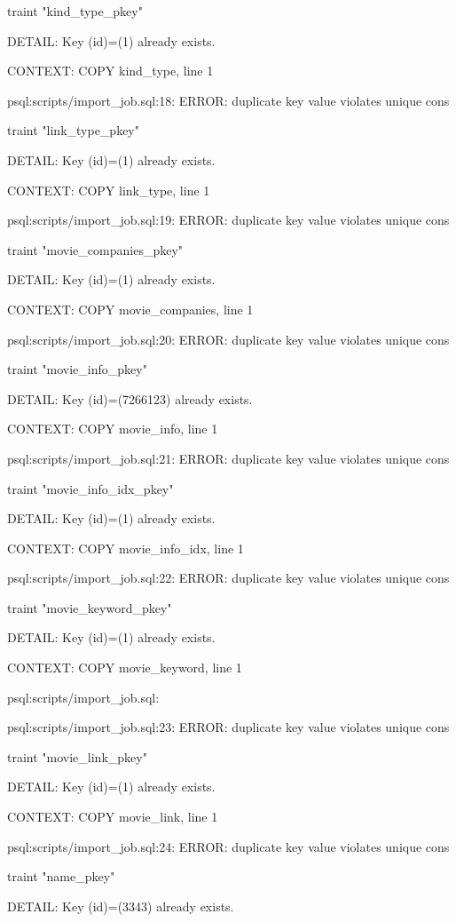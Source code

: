 \documentclass[11pt,a4paper]{article}
\begin{document}
traint "kind\_type\_pkey"

DETAIL:  Key (id)=(1) already exists.

CONTEXT:  COPY kind\_type, line 1

psql:scripts/import\_job.sql:18: ERROR:  duplicate key value violates unique cons

traint "link\_type\_pkey"

DETAIL:  Key (id)=(1) already exists.

CONTEXT:  COPY link\_type, line 1

psql:scripts/import\_job.sql:19: ERROR:  duplicate key value violates unique cons

traint "movie\_companies\_pkey"

DETAIL:  Key (id)=(1) already exists.

CONTEXT:  COPY movie\_companies, line 1

psql:scripts/import\_job.sql:20: ERROR:  duplicate key value violates unique cons

traint "movie\_info\_pkey"

DETAIL:  Key (id)=(7266123) already exists.

CONTEXT:  COPY movie\_info, line 1

psql:scripts/import\_job.sql:21: ERROR:  duplicate key value violates unique cons

traint "movie\_info\_idx\_pkey"

DETAIL:  Key (id)=(1) already exists.

CONTEXT:  COPY movie\_info\_idx, line 1

psql:scripts/import\_job.sql:22: ERROR:  duplicate key value violates unique cons

traint "movie\_keyword\_pkey"

DETAIL:  Key (id)=(1) already exists.

CONTEXT:  COPY movie\_keyword, line 1

psql:scripts/import\_job.sql:

psql:scripts/import\_job.sql:23: ERROR:  duplicate key value violates unique cons

traint "movie\_link\_pkey"

DETAIL:  Key (id)=(1) already exists.

CONTEXT:  COPY movie\_link, line 1

psql:scripts/import\_job.sql:24: ERROR:  duplicate key value violates unique cons

traint "name\_pkey"

DETAIL:  Key (id)=(3343) already exists.
\end{document}
